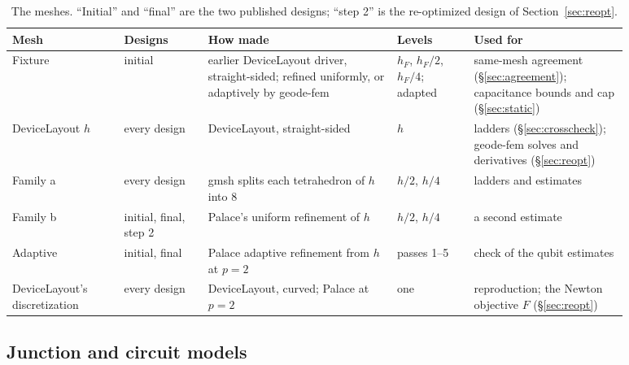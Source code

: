 \documentclass{anvil-paper}
\begin{document}
\begin{table}[htbp]
  \centering
  \caption{The meshes. ``Initial'' and ``final'' are the two published
  designs; ``step 2'' is the re-optimized design of
  Section~\ref{sec:reopt}.}
  \label{tab:meshes}
  \footnotesize
  \begin{tabular}{@{}>{\raggedright\arraybackslash}p{0.16\linewidth}>{\raggedright\arraybackslash}p{0.12\linewidth}>{\raggedright\arraybackslash}p{0.27\linewidth}>{\raggedright\arraybackslash}p{0.11\linewidth}>{\raggedright\arraybackslash}p{0.22\linewidth}@{}}
    \toprule
    Mesh & Designs & How made & Levels & Used for \\
    \midrule
    Fixture & initial & earlier DeviceLayout driver, straight-sided; refined uniformly, or adaptively by geode-fem & $h_F$, $h_F/2$, $h_F/4$; adapted & same-mesh agreement (\S\ref{sec:agreement}); capacitance bounds and cap (\S\ref{sec:static}) \\
    DeviceLayout $h$ & every design & DeviceLayout, straight-sided & $h$ & ladders (\S\ref{sec:crosscheck}); geode-fem solves and derivatives (\S\ref{sec:reopt}) \\
    Family a & every design & gmsh splits each tetrahedron of $h$ into 8 & $h/2$, $h/4$ & ladders and estimates \\
    Family b & initial, final, step 2 & Palace's uniform refinement of $h$ & $h/2$, $h/4$ & a second estimate \\
    Adaptive & initial, final & Palace adaptive refinement from $h$ at $p = 2$ & passes 1--5 & check of the qubit estimates \\
    DeviceLayout's discretization & every design & DeviceLayout, curved; Palace at $p = 2$ & one & reproduction; the Newton objective $F$ (\S\ref{sec:reopt}) \\
    \bottomrule
  \end{tabular}
\end{table}

\subsection{Junction and circuit models}
\label{sec:junction}
\end{document}
